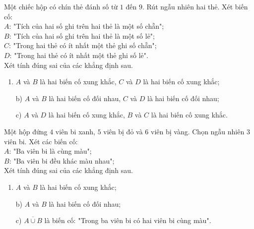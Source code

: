 \begin{bt}%
	Một chiếc hộp có chín thẻ đánh số từ $1$ đến $9$. Rút ngẫu nhiên hai thẻ. Xét biến cố:\\
		\indent $A$: "Tích của hai số ghi trên hai thẻ là một số chẵn";\\
		\indent $B$: "Tích của hai số ghi trên hai thẻ là một số lẻ";\\
		\indent $C$: "Trong hai thẻ có ít nhất một thẻ ghi số chẵn";\\
		\indent $D$: "Trong hai thẻ có ít nhất một thẻ ghi số lẻ".\\
	Xét tính đúng sai của các khẳng định sau.
	\begin{enumerate}
		\item $A$ và $B$ là hai biến cố xung khắc, $C$ và $D$ là hai biến cố xung khắc;
		\item[b)] $A$ và $B$ là hai biến cố đối nhau, $C$ và $D$ là hai biến cố đối nhau;
		\item[c)] $A$ và $D$ là hai biến cố xung khắc, $B$ và $C$ là hai biến cố xung khắc.
	\end{enumerate}
\end{bt}
\begin{bt}%
	Một hộp đứng $4$ viên bi xanh, $5$ viên bị đỏ và $6$ viên bị vàng. Chọn ngẫu nhiên $3$ viên bi. Xét các biến cố:\\
	\indent $A$: "Ba viên bi là cùng màu";\\
	\indent $B$: "Ba viên bi đều khác màu nhau";\\
	Xét tính đúng sai của các khẳng định sau.
	\begin{enumerate}
		\item $A$ và $B$ là hai biến cố xung khắc;
		\item[b)] $A$ và $B$ là hai biến cố đối nhau;
		\item[c)] $\overline{A \cup B} $ là biến cố: "Trong ba viên bi có hai viên bi cùng màu".
	\end{enumerate}
\end{bt}

